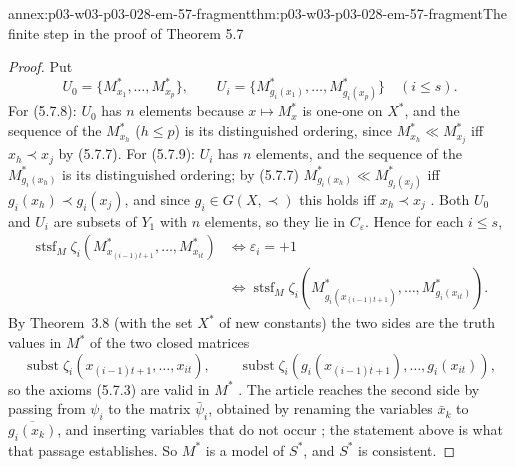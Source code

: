 \begin{annexitem}{annex:p03-w03-p03-028-em-57-fragment}{thm:p03-w03-p03-028-em-57-fragment}{The finite step in the proof of Theorem 5.7}
\begin{proof}
Put
\[
  U_0=\{M^*_{x_1},\ldots,M^*_{x_p}\},\qquad
  U_i=\{M^*_{g_i(x_1)},\ldots,M^*_{g_i(x_p)}\}\quad(i\leq s).
\]
For (5.7.8): \(U_0\) has \(n\) elements because \(x\mapsto M^*_x\) is one-one
on \(X^*\), and the sequence of the \(M^*_{x_h}\) (\(h\leq p\)) is its
distinguished ordering, since \(M^*_{x_h}\ll M^*_{x_j}\) iff
\(x_h\prec x_j\) by (5.7.7).  For (5.7.9): \(U_i\) has \(n\) elements, and the
sequence of the \(M^*_{g_i(x_h)}\) is its distinguished ordering; by
(5.7.7) \(M^*_{g_i(x_h)}\ll M^*_{g_i(x_j)}\) iff \(g_i(x_h)\prec g_i(x_j)\), and
since \(g_i\in G(X,\prec)\) this holds iff \(x_h\prec x_j\)
\cite[p.~65]{EhrenfeuchtMostowski1956}.  Both \(U_0\) and \(U_i\) are subsets of
\(Y_1\) with \(n\) elements, so they lie in \(C_\varepsilon\).  Hence for each
\(i\leq s\),
\begin{align*}
  \operatorname{stsf}_M\zeta_i(M^*_{x_{(i-1)t+1}},\ldots,M^*_{x_{it}})
  &\iff\varepsilon_i=+1\\
  &\iff\operatorname{stsf}_M\zeta_i(M^*_{g_i(x_{(i-1)t+1})},\ldots,M^*_{g_i(x_{it})}).
\end{align*}
By Theorem~3.8 (with the set \(X^*\) of new constants) the two sides are the
truth values in \(M^*\) of the two closed matrices
\[
  \operatorname{subst}\zeta_i(x_{(i-1)t+1},\ldots,x_{it}),\qquad
  \operatorname{subst}\zeta_i(g_i(x_{(i-1)t+1}),\ldots,g_i(x_{it})),
\]
so the axioms (5.7.3) are valid in \(M^*\) \cite[(5.7.10), p.~66]{EhrenfeuchtMostowski1956}.
The article reaches the second side by passing from \(\psi_i\) to the matrix
\(\bar\psi_i\), obtained by renaming the variables \(\bar x_k\) to
\(\overline{g_i(x_k)}\), and inserting variables that do not occur
\cite[pp.~64, 66]{EhrenfeuchtMostowski1956}; the statement above is what that
passage establishes.  So \(M^*\) is a model of \(S^*\), and \(S^*\) is
consistent.
\end{proof}
\end{annexitem}

